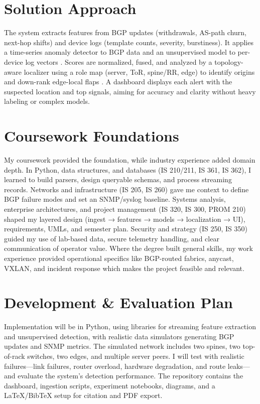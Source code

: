 \documentclass[11pt]{article}
\begin{document}
\section{Solution Approach}

The system extracts features from BGP updates (withdrawals, AS-path churn, next-hop shifts) and device logs (template counts, severity, burstiness). It applies a time-series anomaly detector to BGP data \cite{scott2024} and an unsupervised model to per-device log vectors \cite{cheng2021}. Scores are normalized, fused, and analyzed by a topology-aware localizer using a role map (server, ToR, spine/RR, edge) to identify origins and down-rank edge-local flaps \cite{tan2024}. A dashboard displays each alert with the suspected location and top signals, aiming for accuracy and clarity without heavy labeling or complex models.

\section{Coursework Foundations}

My coursework provided the foundation, while industry experience added domain depth. In Python, data structures, and databases (IS 210/211, IS 361, IS 362), I learned to build parsers, design queryable schemas, and process streaming records. Networks and infrastructure (IS 205, IS 260) gave me context to define BGP failure modes and set an SNMP/syslog baseline. Systems analysis, enterprise architectures, and project management (IS 320, IS 300, PROM 210) shaped my layered design (ingest → features → models → localization → UI), requirements, UMLs, and semester plan. Security and strategy (IS 250, IS 350) guided my use of lab-based data, secure telemetry handling, and clear communication of operator value. Where the degree built general skills, my work experience provided operational specifics like BGP-routed fabrics, anycast, VXLAN, and incident response which makes the project feasible and relevant.

\section{Development \& Evaluation Plan}

Implementation will be in Python, using libraries for streaming feature extraction and unsupervised detection, with realistic data simulators generating BGP updates and SNMP metrics. The simulated network includes two spines, two top-of-rack switches, two edges, and multiple server peers. I will test with realistic failures—link failures, router overload, hardware degradation, and route leaks—and evaluate the system's detection performance. The repository contains the dashboard, ingestion scripts, experiment notebooks, diagrams, and a LaTeX/BibTeX setup for citation and PDF export.
\end{document}
